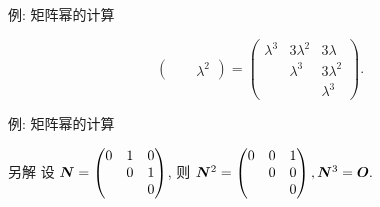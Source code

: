 \begin{frame}{例: 矩阵幂的计算}
\begin{solution}
{\[\begin{pmatrix}
				&&\lambda^2
			\end{pmatrix}=\begin{pmatrix}
				\lambda^3&3\lambda^2&3\lambda\\
				&\lambda^3&3\lambda^2\\
				&&\lambda^3
			\end{pmatrix}.\]
		}\vspace{-.2\baselineskip}
	\end{solution}
\endgroup
\end{frame}


\begin{frame}{例: 矩阵幂的计算}
	\onslide<+->
	\begin{solution}{另解}
		设 ${\boldsymbol{N}}=\begin{pmatrix}
			0&1&0\\
			&0&1\\
			&&0
		\end{pmatrix}$, 则
		${\boldsymbol{N}}^2=\begin{pmatrix}
			0&0&1\\
			&0&0\\
			&&0
		\end{pmatrix},{\boldsymbol{N}}^3={\boldsymbol{O}}.$
		\vspace{-\baselineskip}
	\end{solution}
\end{frame}


